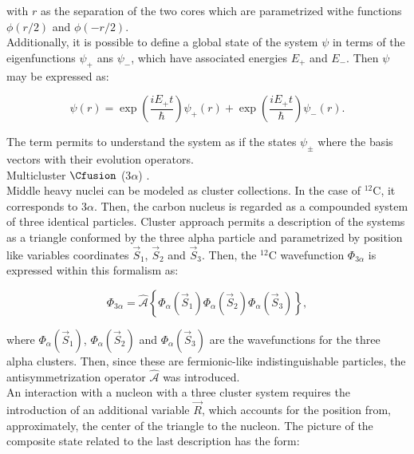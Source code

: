 \documentclass[openany]{book}
\begin{document}
with $r$ as the separation of the two cores which are parametrized withe functions $\phi(r/2) $ and $ \phi(-r/2)$.  \\

Additionally, it is possible to define a global state of the system $\psi$ in terms of the eigenfunctions $\psi_+$ ans $\psi_-$, which have associated energies $E_+$ and $E_-$. Then $\psi$ may be expressed as: 

\begin{equation}\label{eq:micro_twoCenterShell_solution_superposition}
	\psi(r) =  \exp {\left(\frac{iE_+ t}{\hbar}\right)} \psi_{+}(r) +   \exp {\left(\frac{iE_+ t}{\hbar}\right)}  \psi_{-}(r).
\end{equation}

The term permits to understand the system as if the states $ \psi_{\pm}$ where the basis vectors with their evolution operators. \\


Multicluster $\Cfusion$ (3$\alpha$) \cite{dufour_descouvemont_1997}. \\

Middle heavy nuclei can be modeled as cluster collections. In the case of $\mathrm{{}^{12}C}$, it corresponds to $3 \alpha$. Then, the carbon nucleus is regarded as a compounded system of three identical particles. Cluster approach permits a description of the systems as a triangle conformed by the three alpha particle and parametrized by position like variables coordinates $\vec S_1 $, $\vec S_2$ and $\vec S_3$. Then, the $\mathrm{{}^{12}C}$ wavefunction $\Phi_{3\alpha}$ is expressed within this formalism as: 

\begin{equation}\label{eq:micro_multicluster_3alpha}
	\Phi_{3\alpha} = \hat {\mathcal{A}} \left\{ \Phi_\alpha (\vec S_1) \Phi_\alpha(\vec S_2) \Phi_\alpha(\vec S_3) \right\},
\end{equation}

where $\Phi_\alpha (\vec S_1)$,   $\Phi_\alpha (\vec S_2)$ and 
$\Phi_\alpha (\vec S_3)$ are the wavefunctions for the three alpha clusters. Then, since these are fermionic-like indistinguishable particles, the antisymmetrization operator  $\hat {\mathcal{A}} $ was introduced. \\

An interaction with a nucleon with a three cluster system requires the introduction of an additional variable $\vec R$, which accounts for the position from, approximately, the center of the triangle to the nucleon. The picture of the composite state related to the last description has the form: 
\end{document}

